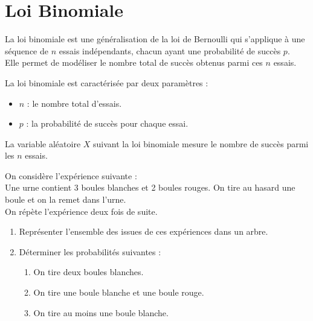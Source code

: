 \documentclass[11pt]{article}
\begin{document}
\section{Loi Binomiale}

\begin{definition}
La loi binomiale est une généralisation de la loi de Bernoulli qui
s'applique à une séquence de $n$ essais indépendants, chacun ayant une
probabilité de succès $p$. \\
Elle permet de modéliser le nombre total de succès obtenus parmi ces $n$ essais.
\end{definition}

\begin{propriete}
  \begin{enu}
  \item La loi binomiale est caractérisée par deux paramètres :
    \begin{itemize}
    \item $n$ : le nombre total d'essais.
    \item $p$ : la probabilité de succès pour chaque essai.
    \end{itemize}
  \item La variable aléatoire $X$ suivant la loi binomiale mesure le
    nombre de succès parmi les $n$ essais.
  \end{enu}
\end{propriete}

\begin{exercice}
On considère l'expérience suivante : \\
Une urne contient 3 boules blanches et 2 boules rouges. On tire au
hasard une boule et on la remet dans l'urne. \\
On répète l'expérience deux fois de suite.
\begin{enumerate}
\item Représenter l'ensemble des issues de ces expériences dans un arbre.
\item Déterminer les probabilités suivantes :
  \begin{enumerate}
  \item On tire deux boules blanches. 
  \item  On tire une boule blanche et une boule rouge. 
  \item  On tire au moins une boule blanche.
  \end{enumerate}
\end{enumerate}
\end{exercice}
\end{document}
